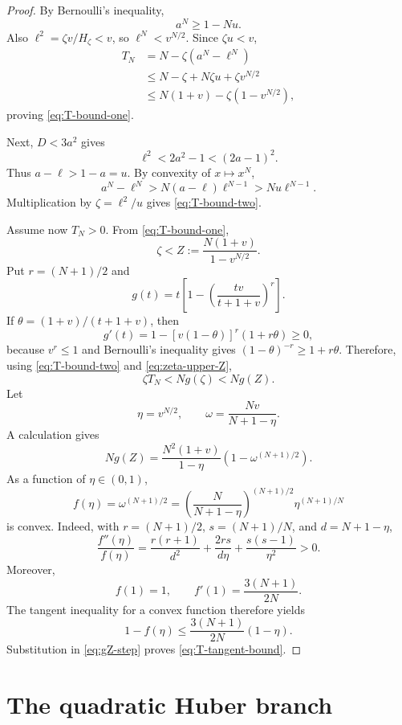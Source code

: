 \documentclass[11pt]{article}
\begin{document}
\begin{proof}
By Bernoulli's inequality,
\[
       a^N\ge1-Nu.
\]
Also \(\ell^2=\zeta v/H_\zeta<v\), so
\(\ell^N<v^{N/2}\).  Since \(\zeta u< v\),
\[
\begin{aligned}
 T_N
 &=N-\zeta(a^N-\ell^N)\\
 &\le N-\zeta+N\zeta u+\zeta v^{N/2}\\
 &\le N(1+v)-\zeta(1-v^{N/2}),
\end{aligned}
\]
proving \eqref{eq:T-bound-one}.

Next, \(D<3a^2\) gives
\[
       \ell^2<2a^2-1<(2a-1)^2.
\]
Thus \(a-\ell>1-a=u\).  By convexity of \(x\mapsto x^N\),
\[
       a^N-\ell^N>N(a-\ell)\ell^{N-1}>Nu\ell^{N-1}.
\]
Multiplication by \(\zeta=\ell^2/u\) gives
\eqref{eq:T-bound-two}.

Assume now \(T_N>0\).  From \eqref{eq:T-bound-one},
\begin{equation}\label{eq:zeta-upper-Z}
       \zeta<Z:=\frac{N(1+v)}{1-v^{N/2}}.
\end{equation}
Put \(r=(N+1)/2\) and
\[
       g(t)=t\left[1-
       \left(\frac{tv}{t+1+v}\right)^r\right].
\]
If \(\theta=(1+v)/(t+1+v)\), then
\[
       g'(t)=1-[v(1-\theta)]^r(1+r\theta)\ge0,
\]
because \(v^r\le1\) and Bernoulli's inequality gives
\((1-\theta)^{-r}\ge1+r\theta\).  Therefore,
using \eqref{eq:T-bound-two} and \eqref{eq:zeta-upper-Z},
\begin{equation}\label{eq:gZ-step}
 \zeta T_N<N g(\zeta)<Ng(Z).
\end{equation}
Let
\[
       \eta=v^{N/2},
       \qquad
       \omega=\frac{Nv}{N+1-\eta}.
\]
A calculation gives
\[
       Ng(Z)=
       \frac{N^2(1+v)}{1-\eta}
       \left(1-\omega^{(N+1)/2}\right).
\]
As a function of \(\eta\in(0,1)\),
\[
 f(\eta)=\omega^{(N+1)/2}
 =\left(\frac{N}{N+1-\eta}\right)^{(N+1)/2}
  \eta^{(N+1)/N}
\]
is convex.  Indeed, with
\(r=(N+1)/2\), \(s=(N+1)/N\), and \(d=N+1-\eta\),
\[
       \frac{f''(\eta)}{f(\eta)}
       =\frac{r(r+1)}{d^2}
        +\frac{2rs}{d\eta}
        +\frac{s(s-1)}{\eta^2}>0.
\]
Moreover,
\[
       f(1)=1,
       \qquad
       f'(1)=\frac{3(N+1)}{2N}.
\]
The tangent inequality for a convex function therefore yields
\[
       1-f(\eta)
       \le\frac{3(N+1)}{2N}(1-\eta).
\]
Substitution in \eqref{eq:gZ-step} proves
\eqref{eq:T-tangent-bound}.
\end{proof}

\section{The quadratic Huber branch}\label{sec:quadratic}
\end{document}
